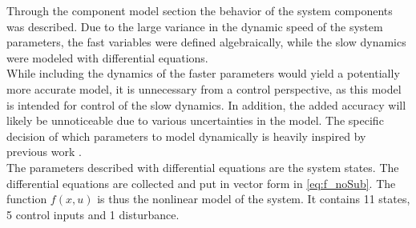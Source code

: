 Through the component model section the behavior of the system components was described. Due to the large variance in the dynamic speed of the system parameters, the fast variables were defined algebraically, while the slow dynamics were modeled with differential equations. \\
While including the dynamics of the faster parameters would yield a potentially more accurate model, it is unnecessary from a control perspective, as this model is intended for control of the slow dynamics. In addition, the added accuracy will likely be unnoticeable due to various uncertainties in the model. The specific decision of which parameters to model dynamically is heavily inspired by previous work \cite{Sorensen2013}.\\
The parameters described with differential equations are the system states. The differential equations are collected and put in vector form in \cref{eq:f_noSub}. The function $f(x,u)$ is thus the nonlinear model of the system. It contains 11 states, 5 control inputs and 1 disturbance.



